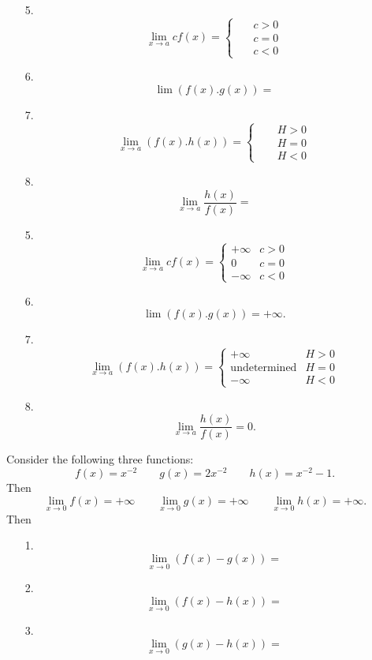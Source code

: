 \documentclass{beamer}
\begin{document}
\begin{frame}
\begin{theorem}
	\begin{itemize}
\item[5.] $$\lim_{x\to a}cf(x)=\begin{cases}
~~~ & c>0\\
~~~& c=0\\
~~~ & c<0
\end{cases}$$
\item[6.] $$\lim(f(x).g(x))=$$
\item[7.] $$\lim_{x\to a} (f(x).h(x))
=\begin{cases}
~~~~ & H>0\\
 ~~~& H=0\\
~~~ & H<0
\end{cases}$$
\item[8.] $$\lim_{x\to a} \frac{h(x)}{f(x)}=$$
\end{itemize}
\end{theorem}
\end{frame}


\begin{frame}
\begin{theorem}
	\begin{itemize}
		\item[5.] $$\lim_{x\to a}cf(x)=\begin{cases}
		+\infty & c>0\\
		0 & c=0\\
		-\infty & c<0
		\end{cases}$$
		\item[6.] $$\lim(f(x).g(x))=+\infty.$$
		\item[7.] $$\lim_{x\to a} (f(x).h(x))
		=\begin{cases}
		+\infty & H>0\\
		\text{undetermined} & H=0\\
		-\infty & H<0
		\end{cases}$$
		\item[8.] $$\lim_{x\to a} \frac{h(x)}{f(x)}=0.$$
	\end{itemize}
\end{theorem}
\end{frame}

\begin{frame}

\begin{Example}
	Consider the following three functions:
	$$f(x)=x^{-2}\quad \quad g(x)=2x^{-2}\quad \quad h(x)=x^{-2}-1.$$
	Then 
	$$\lim_{x\to 0}f(x)=+\infty \quad \quad \lim_{x\to 0}g(x)=+\infty \quad \quad \lim_{x\to 0}h(x)=+\infty.$$
	Then 
	\begin{itemize}
		\item[1.] $$ \lim_{x\to 0} (f(x)-g(x))=$$
		\item[2.] $$ \lim_{x\to 0} (f(x)-h(x))=$$
		\item[3.] $$ \lim_{x\to 0} (g(x)-h(x))=$$
	\end{itemize}
\end{Example}
\end{frame}
\end{document}
